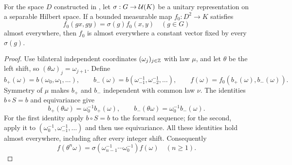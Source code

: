\begin{lemma}
\label{lem:double-ergodicity}
For the space $D$ constructed in , let
$\sigma:G\to\mathcal U(K)$ be a unitary representation on a separable Hilbert
space.  If a bounded measurable map $f_0:D^2\to K$ satisfies
\[
 f_0(gx,gy)=\sigma(g)f_0(x,y)\quad(g\in G)
\]
almost everywhere, then $f_0$ is almost everywhere a constant vector
fixed by every $\sigma(g)$.
\end{lemma}

\begin{proof}
Use bilateral independent coordinates $(\omega_j)_{j\in\mathbb Z}$ with law
$\mu$, and let $\theta$ be the left shift, so
$(\theta\omega)_j=\omega_{j+1}$.  Define
\[
 b_+(\omega)=b(\omega_0,\omega_1,\ldots),\qquad
 b_-(\omega)=b(\omega_{-1}^{-1},\omega_{-2}^{-1},\ldots),\qquad
 f(\omega)=f_0(b_+(\omega),b_-(\omega)).
\]
Symmetry of $\mu$ makes $b_+$ and $b_-$ independent with common law
$\nu$.  The identities $b\circ S=b$ and equivariance give
\[
 b_+(\theta\omega)=\omega_0^{-1}b_+(\omega),\qquad
 b_-(\theta\omega)=\omega_0^{-1}b_-(\omega).
\]
For the first identity apply $b\circ S=b$ to the forward sequence;
for the second, apply it to
$(\omega_0^{-1},\omega_{-1}^{-1},\ldots)$ and then use equivariance.
All these identities hold almost everywhere, including after every
integer shift.  Consequently
\begin{equation}\label{eq:boundary-bilateral-transport}
 f(\theta^n\omega)
 =\sigma(\omega_{n-1}^{-1}\cdots\omega_0^{-1})f(\omega)
 \quad(n\ge1).
\end{equation}


\end{proof}
